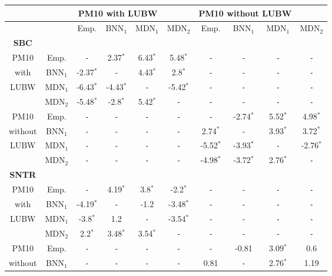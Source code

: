 \begin{tabular}{c|c|cccc||cccc} 
  \hline 
  \hline 
  &&\multicolumn{3}{c}{PM10 with LUBW} && \multicolumn{3}{c}{PM10 without LUBW} \\ 
  \hline 
  &&Emp.&BNN$_1$&MDN$_1$&MDN$_2$&Emp.&BNN$_1$&MDN$_1$&MDN$_2$ \\ 
  \hline 
  \hline 
  \textbf{SBC}&&&&&&& \\ 
  PM10&Emp.&\texttt{\--}&2.37$^*$&6.43$^*$&5.48$^*$&\texttt{\--}&\texttt{\--}&\texttt{\--}&\texttt{\--} \\ 
  with&BNN$_1$&-2.37$^*$&\texttt{\--}&4.43$^*$&2.8$^*$&\texttt{\--}&\texttt{\--}&\texttt{\--}&\texttt{\--} \\ 
  LUBW&MDN$_1$&-6.43$^*$&-4.43$^*$&\texttt{\--}&-5.42$^*$&\texttt{\--}&\texttt{\--}&\texttt{\--}&\texttt{\--} \\ 
  &MDN$_2$&-5.48$^*$&-2.8$^*$&5.42$^*$&\texttt{\--}&\texttt{\--}&\texttt{\--}&\texttt{\--}&\texttt{\--} \\ 
  \hline     
  PM10&Emp.&\texttt{\--}&\texttt{\--}&\texttt{\--}&\texttt{\--}&\texttt{\--}&-2.74$^*$&5.52$^*$&4.98$^*$ \\ 
  without&BNN$_1$&\texttt{\--}&\texttt{\--}&\texttt{\--}&\texttt{\--}&2.74$^*$&\texttt{\--}&3.93$^*$&3.72$^*$ \\ 
  LUBW&MDN$_1$&\texttt{\--}&\texttt{\--}&\texttt{\--}&\texttt{\--}&-5.52$^*$&-3.93$^*$&\texttt{\--}&-2.76$^*$ \\ 
  &MDN$_2$&\texttt{\--}&\texttt{\--}&\texttt{\--}&\texttt{\--}&-4.98$^*$&-3.72$^*$&2.76$^*$&\texttt{\--} \\ 
  \hline     
  \hline     
\textbf{SNTR}&&&&&&& \\ 
  PM10&Emp.&\texttt{\--}&4.19$^*$&3.8$^*$&-2.2$^*$&\texttt{\--}&\texttt{\--}&\texttt{\--}&\texttt{\--} \\ 
  with&BNN$_1$&-4.19$^*$&\texttt{\--}&-1.2&-3.48$^*$&\texttt{\--}&\texttt{\--}&\texttt{\--}&\texttt{\--} \\ 
  LUBW&MDN$_1$&-3.8$^*$&1.2&\texttt{\--}&-3.54$^*$&\texttt{\--}&\texttt{\--}&\texttt{\--}&\texttt{\--} \\ 
  &MDN$_2$&2.2$^*$&3.48$^*$&3.54$^*$&\texttt{\--}&\texttt{\--}&\texttt{\--}&\texttt{\--}&\texttt{\--} \\ 
  \hline     
  PM10&Emp.&\texttt{\--}&\texttt{\--}&\texttt{\--}&\texttt{\--}&\texttt{\--}&-0.81&3.09$^*$&0.6 \\ 
  without&BNN$_1$&\texttt{\--}&\texttt{\--}&\texttt{\--}&\texttt{\--}&0.81&\texttt{\--}&2.76$^*$&1.19 \\ 

\end{tabular}
